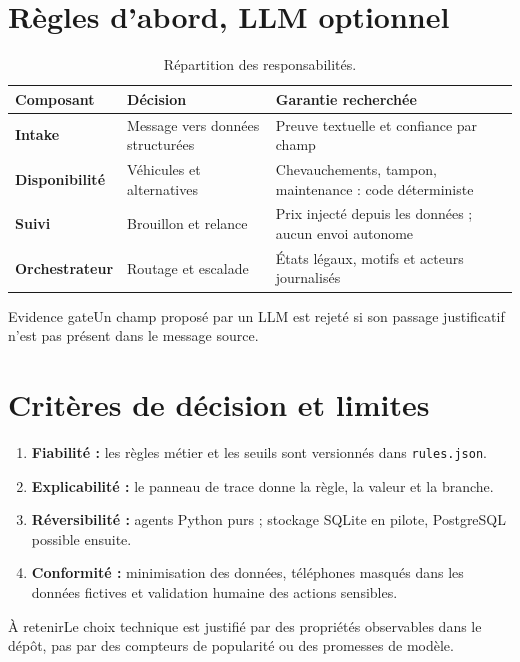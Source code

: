 \documentclass[11pt,a4paper,openany]{report}
\newcommand{\takeaway}[1]{\begin{keybox}{À retenir}#1\end{keybox}}
\begin{document}
\section{Règles d'abord, LLM optionnel}
\begin{table}[H]\centering\small\caption{Répartition des responsabilités.}\begin{tabularx}{\linewidth}{>{\bfseries}p{.25\linewidth}X X}\toprule
Composant & Décision & Garantie recherchée\\\midrule
Intake & Message vers données structurées & Preuve textuelle et confiance par champ\\
Disponibilité & Véhicules et alternatives & Chevauchements, tampon, maintenance : code déterministe\\
Suivi & Brouillon et relance & Prix injecté depuis les données ; aucun envoi autonome\\
Orchestrateur & Routage et escalade & États légaux, motifs et acteurs journalisés\\\bottomrule
\end{tabularx}\end{table}
\begin{riskbox}{Evidence gate}Un champ proposé par un LLM est rejeté si son passage justificatif n'est pas présent dans le message source.\end{riskbox}
\clearpage

\section{Critères de décision et limites}
\begin{enumerate}[leftmargin=1.2cm,itemsep=8pt]
\item \textbf{Fiabilité :} les règles métier et les seuils sont versionnés dans \texttt{rules.json}.
\item \textbf{Explicabilité :} le panneau de trace donne la règle, la valeur et la branche.
\item \textbf{Réversibilité :} agents Python purs ; stockage SQLite en pilote, PostgreSQL possible ensuite.
\item \textbf{Conformité :} minimisation des données, téléphones masqués dans les données fictives et validation humaine des actions sensibles.
\end{enumerate}
\takeaway{Le choix technique est justifié par des propriétés observables dans le dépôt, pas par des compteurs de popularité ou des promesses de modèle.}
\clearpage

\end{document}
